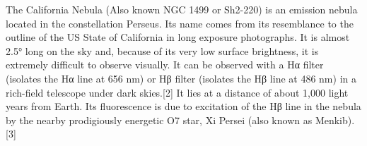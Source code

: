 The California Nebula (Also known NGC 1499 or Sh2-220) is an emission nebula located in the constellation Perseus. Its name comes from its resemblance to the outline of the US State of California in long exposure photographs. It is almost 2.5° long on the sky and, because of its very low surface brightness, it is extremely difficult to observe visually. It can be observed with a Hα filter (isolates the Hα line at 656 nm) or Hβ filter (isolates the Hβ line at 486 nm) in a rich-field telescope under dark skies.[2] It lies at a distance of about 1,000 light years from Earth. Its fluorescence is due to excitation of the Hβ line in the nebula by the nearby prodigiously energetic O7 star, Xi Persei (also known as Menkib).[3]
